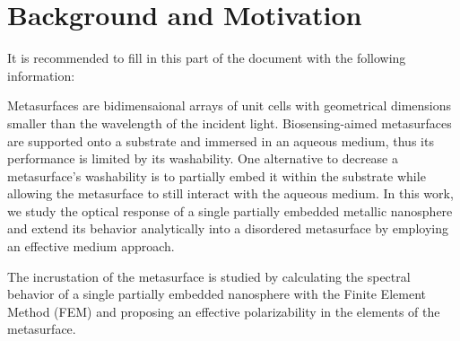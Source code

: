 
\chapter*{Background and Motivation}
\label{chapter:intro}



 It is recommended to fill in this part of the document with the following information:

Metasurfaces are bidimensaional arrays of unit cells with geometrical dimensions smaller than the wavelength of the incident light. Biosensing-aimed metasurfaces are supported onto a substrate and immersed in an aqueous medium, thus its performance is limited by its washability. One alternative to decrease a metasurface's washability is to partially embed it within the substrate while allowing the metasurface to still interact with the aqueous medium. In this work, we study the optical response of a single partially embedded metallic nanosphere  and extend its behavior analytically into a disordered metasurface by employing an effective medium approach.

The incrustation of the metasurface is studied by calculating the spectral behavior of a single partially embedded nanosphere with the Finite Element Method (FEM) and proposing an effective polarizability  in the elements of the metasurface.

